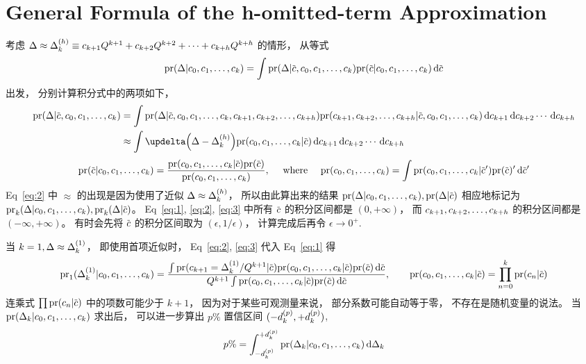 
\section{General Formula of the h-omitted-term Approximation}
考虑 $\Delta\approx\Delta_k^{(h)}\equiv c_{k+1}Q^{k+1}+c_{k+2}Q^{k+2}+\cdots
+c_{k+h}Q^{k+h}$ 的情形，
从等式
\begin{equation}
  \label{eq:1}
  \dmspr (\Delta|\dmsccck)=
  \int \dmspr(\Delta|\dmscbar,\dmsccck)
  \dmspr(\dmscbar|\dmsccck)\dmsdif\dmscbar
\end{equation}
出发，
分别计算积分式中的两项如下，
\begin{equation}
  \label{eq:2}
  \begin{aligned}
    \dmspr(\Delta|\dmscbar,\dmsccck)
    &= \int \dmspr(\Delta|\dmscbar,\dmsccck,\dmsccch)
    \dmspr(\dmsccch|\dmscbar,\dmsccck)\dmsdifccch \\
    &\approx \int \updelta\Bigl(\Delta-\dmsdeltakh\Bigr)
    \dmspr(\dmsccck|\dmscbar)\dmsdifccch
  \end{aligned}
\end{equation}
\begin{equation}
  \label{eq:3}
    \dmspr(\dmscbar|\dmsccck)
    = \frac{\dmspr(\dmsccck|\dmscbar)\dmspr(\dmscbar)}{\dmspr(\dmsccck)},
    \quad \textrm{ where } \quad
    \dmspr(\dmsccck)=\int\dmspr(\dmsccck|\dmscbar^\prime)
    \dmspr(\dmscbar)^\prime\dmsdif\dmscbar^\prime
\end{equation}
Eq~\eqref{eq:2} 中 $\approx$ 的出现是因为使用了近似
$\Delta\approx\Delta_k^{(h)}$，
所以由此算出来的结果 $\dmspr(\Delta|\dmsccck),\dmspr(\Delta|\dmscbar)$
相应地标记为 $\dmspr_k(\Delta|\dmsccck),\dmspr_k(\Delta|\dmscbar)$。
Eq~\eqref{eq:1}, \eqref{eq:2}, \eqref{eq:3} 中所有 $\dmscbar$ 的积分区间都是
 $(0,+\infty)$，
而 $c_{k+1},c_{k+2},\ldots,c_{k+h}$ 的积分区间都是 $(-\infty,+\infty)$。
有时会先将 $\dmscbar$ 的积分区间取为 $(\epsilon,1/\epsilon)$，
计算完成后再令 $\epsilon \to 0^+$.

当 $k=1, \Delta\approx\Delta_k^{(1)}$，
即使用首项近似时，
Eq~\eqref{eq:2}, \eqref{eq:3} 代入 Eq~\eqref{eq:1} 得
\begin{equation}
  \label{eq:PrDelta}
  \dmspr_1(\dmsdeltako|\dmsccck)=
  \frac{\int\dmspr(c_{k+1}=\dmsdeltako/Q^{k+1}|\dmscbar)
    \dmspr(\dmsccck|\dmscbar)\dmspr(\dmscbar)\dmsdif\dmscbar}{
    Q^{k+1}\int\dmspr(\dmsccck|\dmscbar)\dmspr(\dmscbar)\dmsdif\dmscbar},
  \qquad
  \dmspr(\dmsccck|\dmscbar)=\prod_{n=0}^k\dmspr(c_n|\dmscbar)
\end{equation}
连乘式 $\prod\dmspr(c_n|\dmscbar)$ 中的项数可能少于 $k+1$，
因为对于某些可观测量来说，
部分系数可能自动等于零，
不存在是随机变量的说法。
当 $\textrm{pr}(\Delta_k|c_0,c_1,\ldots,c_k)$ 求出后，
可以进一步算出 $p\%$ 置信区间 $(-d_k^{(p)},+d_k^{(p)})$,
\begin{equation}
  \label{eq:DOB}
  p\%=\int_{-d_k^{(p)}}^{+d_k^{(p)}}\textrm{pr}(\Delta_k|c_0,c_1,\ldots,c_k)\,\mathrm{d}\Delta_k
\end{equation}
